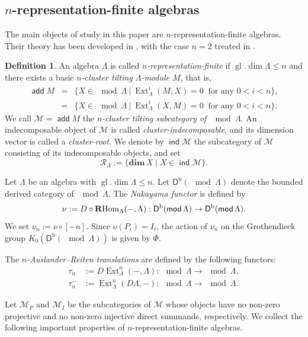 \documentclass[11pt,a4paper]{amsart}
\theoremstyle{definition}
\newtheorem{definition}[theorem]{Definition}
\numberwithin{equation}{section}
\newcommand{\0}{\mathbf{0}}
\newcommand{\dimv}{\mathbf{dim}\,}
\newcommand{\Ext}{\operatorname{Ext}\nolimits}
\newcommand{\bo}{\operatorname{b}\nolimits}
\newcommand{\gl}{\operatorname{gl}.\operatorname{dim}\nolimits}
\newcommand{\RHom}{\mathbf{R}\strut\kern-.2em\operatorname{Hom}\nolimits}
\DeclareMathOperator{\add}{\mathsf{add}}
\DeclareMathOperator{\ind}{\mathsf{ind}}
\newcommand{\DDD}{\mathsf{D}}
\begin{document}
	\subsection{$n$-representation-finite algebras}
	The main objects of study in this paper are $n$-representation-finite
	algebras. Their theory has been developed in
	\cite{HI1,I3,IO1,IO2}, with the case $n=2$ treated in \cite{HI2}.
	
	
	
	\begin{definition}
		An algebra $\Lambda$ is called \emph{$n$-representation-finite} if $\gl\Lambda\le n$ and there exists a basic \emph{$n$-cluster tilting $\Lambda$-module $M$}, that is,
		\begin{eqnarray*}
			\add M&=&\{X\in\mod\Lambda\ |\ \Ext^i_\Lambda(M,X)=0\ \text{ for any } 0<i<n\},\\
			&=&\{X\in\mod\Lambda\ |\ \Ext^i_\Lambda(X,M)=0\ \text{ for any } 0<i<n\}.
		\end{eqnarray*}
		We call $\mathcal{M}=\add M$ the \emph{$n$-cluster tilting subcategory of $\mod \Lambda$}. An indecomposable object of  $\mathcal{M}$ is called \emph{cluster-indecomposable}, and its dimension vector is called a \emph{cluster-root}. We denote by $\ind\mathcal M$  the  subcategory of $\mathcal M$ consisting of its indecomposable objects, and set
		$$\mathcal{R}_\Lambda :=\{\dimv X \mid X \in \ind\mathcal M\}.$$
	\end{definition}
	
	Let $\Lambda$ be an algebra with $\gl\Lambda\le n$. 
	Let $\DDD^{\bo}(\mod\Lambda)$ denote the bounded derived category of $\mod\Lambda$. The \emph{Nakayama functor} is defined by\[ \nu:=D\circ\RHom_\Lambda(-,\Lambda): \DDD^{\bo}(\mod\Lambda)\rightarrow\DDD^{\bo}(\mod\Lambda).\]
	We set $\nu_n:=\nu\circ[-n]$. Since $\nu(P_i)=I_i$, the action of $\nu_n$ on the
	Grothendieck group $K_0(\DDD^{\bo}(\mod\Lambda))$ is given by $\Phi$.
	
	The \emph{$n$-Auslander--Reiten translations} are defined by the following functors: 
	\begin{align*}
		\tau_n&:=D\Ext_\Lambda^n(-,\Lambda):
		\mod\Lambda\rightarrow\mod\Lambda,\\
		\tau_n^-&:=\Ext_\Lambda^n(D\Lambda,-):
		\mod\Lambda\rightarrow\mod\Lambda.
	\end{align*}

	Let $\mathcal{M}_P$ and $\mathcal{M}_I$ be the subcategories of $\mathcal{M}$ whose objects have no non-zero projective and no non-zero injective direct summands, respectively. 	
	We collect the following important properties of $n$-representation-finite
	 algebras.  
	
\end{document}
